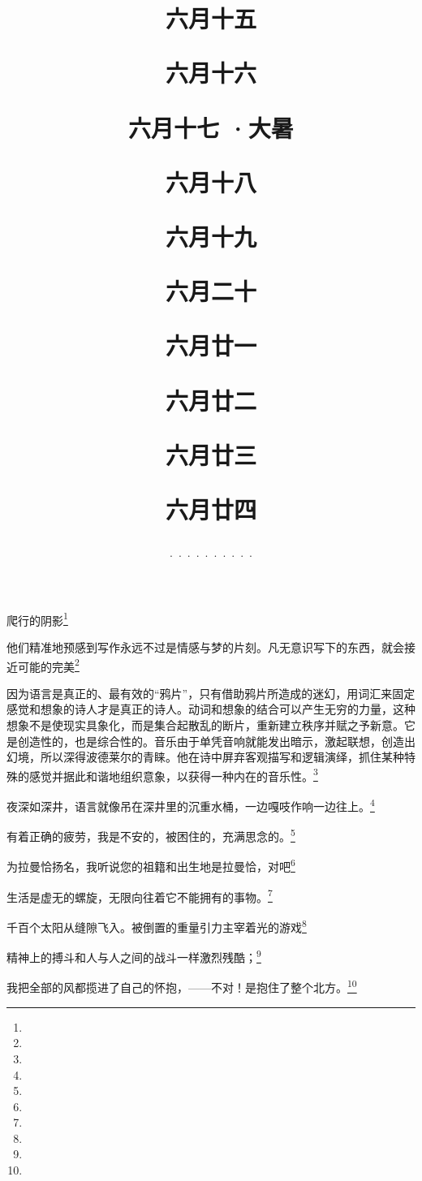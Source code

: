 \title{\date[d=20,m=7,y=2024][year:cn-y,年,month:cn,day:cn,日,·,weekday]·六月十五 }
爬行的阴影\footnote{ }

\title{\date[d=21,m=7,y=2024][year:cn-y,年,month:cn,day:cn,日,·,weekday]·六月十六 }
他们精准地预感到写作永远不过是情感与梦的片刻。凡无意识写下的东西，就会接近可能的完美\footnote{ }

\title{\date[d=22,m=7,y=2024][year:cn-y,年,month:cn,day:cn,日,·,weekday]·六月十七 ·大暑}
因为语言是真正的、最有效的“鸦片”，只有借助鸦片所造成的迷幻，用词汇来固定感觉和想象的诗人才是真正的诗人。动词和想象的结合可以产生无穷的力量，这种想象不是使现实具象化，而是集合起散乱的断片，重新建立秩序并赋之予新意。它是创造性的，也是综合性的。音乐由于单凭音响就能发出暗示，激起联想，创造出幻境，所以深得波德莱尔的青睐。他在诗中屏弃客观描写和逻辑演绎，抓住某种特殊的感觉并据此和谐地组织意象，以获得一种内在的音乐性。\footnote{ }

\title{\date[d=23,m=7,y=2024][year:cn-y,年,month:cn,day:cn,日,·,weekday]·六月十八 }
夜深如深井，语言就像吊在深井里的沉重水桶，一边嘎吱作响一边往上。\footnote{ }

\title{\date[d=24,m=7,y=2024][year:cn-y,年,month:cn,day:cn,日,·,weekday]·六月十九 }
有着正确的疲劳，我是不安的，被困住的，充满思念的。\footnote{ }

\title{\date[d=25,m=7,y=2024][year:cn-y,年,month:cn,day:cn,日,·,weekday]·六月二十 }
为拉曼恰扬名，我听说您的祖籍和出生地是拉曼恰，对吧\footnote{ }

\title{\date[d=26,m=7,y=2024][year:cn-y,年,month:cn,day:cn,日,·,weekday]·六月廿一 }
生活是虚无的螺旋，无限向往着它不能拥有的事物。\footnote{ }

\title{\date[d=27,m=7,y=2024][year:cn-y,年,month:cn,day:cn,日,·,weekday]·六月廿二 }
千百个太阳从缝隙飞入。被倒置的重量引力主宰着光的游戏\footnote{ }

\title{\date[d=28,m=7,y=2024][year:cn-y,年,month:cn,day:cn,日,·,weekday]·六月廿三 }
精神上的搏斗和人与人之间的战斗一样激烈残酷；\footnote{ }

\title{\date[d=29,m=7,y=2024][year:cn-y,年,month:cn,day:cn,日,·,weekday]·六月廿四 }
我把全部的风都揽进了自己的怀抱，——不对！是抱住了整个北方。\footnote{ }

